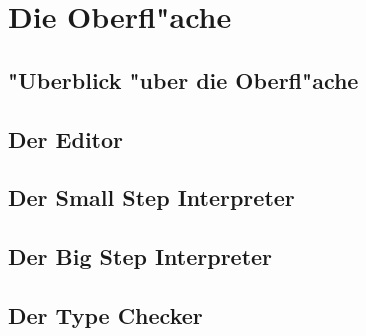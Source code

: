 
\chapter{Die Oberfl"ache}

\section{"Uberblick "uber die Oberfl"ache}

\section{Der Editor}

\section{Der Small Step Interpreter}

\section{Der Big Step Interpreter}

\section{Der Type Checker}



